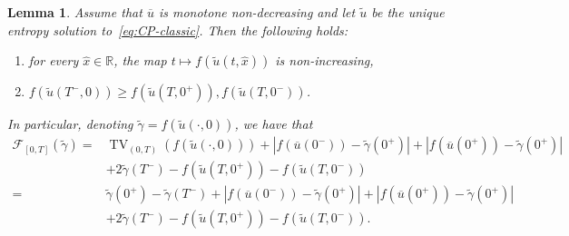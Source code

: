 \documentclass[a4paper, 10pt, final]{article}
\newtheorem{lemma}{Lemma}[section]
\newcommand{\R}{\mathbb{R}} \newcommand{\N}{\mathbb{N}}
\DeclareMathOperator{\tv}{TV}
\begin{document}
\begin{lemma}\label{lemmafdecrescente}
  Assume that $\overline u $ is monotone non-decreasing and let  $\widetilde u$ be the unique entropy solution 
  to~\eqref{eq:CP-classic}.
  Then the following holds:
\begin{enumerate} \item for every $\hat x \in \R$, the map $t \mapsto f(\widetilde{u}(t, \hat{x}))$ is
  non-increasing,
  \item $f(\widetilde{u}(T^-, 0))\geq f(\widetilde{u}(T, 0^+)), f(\widetilde{u}(T, 0^-))$.\end{enumerate}

In particular, denoting $\widetilde \gamma=f(\widetilde u(\cdot,0))$, we have that 
\begin{align*} \mathcal F_{[0, T]}(\widetilde\gamma)
     = &
      \tv_{(0, T)}(f(\widetilde u(\cdot, 0)))
    +
    |f(\overline u(0^-))- \widetilde\gamma(0^+)| + 
    |f(\overline u(0^+))- \widetilde \gamma(0^+)| \\
    &+ 2\widetilde\gamma(T^-)-f(\widetilde{u}(T, 0^+))-f(\widetilde{u}(T, 0^-))
\\ = &  \widetilde \gamma(0^+)- \widetilde \gamma(T^-) +
    |f(\overline u(0^-))- \widetilde\gamma(0^+)| + 
    |f(\overline u(0^+))- \widetilde \gamma(0^+)| \\
    &+ 2\widetilde\gamma(T^-)-f(\widetilde{u}(T, 0^+))-f(\widetilde{u}(T, 0^-)).\end{align*}  
\end{lemma}
\end{document}
